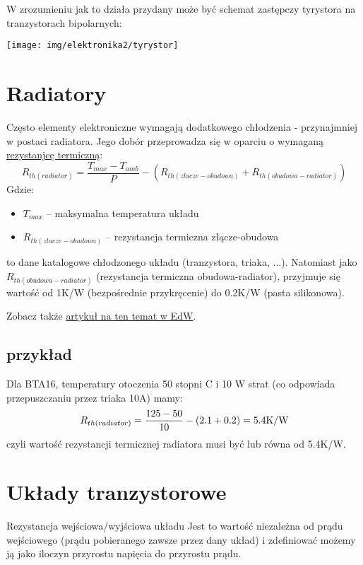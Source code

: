 \documentclass{pdfBooklets}
\begin{document}
W zrozumieniu jak to działa przydany może być schemat zastępczy tyrystora na tranzystorach bipolarnych:

\begin{center}\texttt{[image: img/elektronika2/tyrystor]}\end{center}


\section{Radiatory}

Często elementy elektroniczne wymagają dodatkowego chłodzenia - przynajmniej w postaci radiatora.
Jego dobór przeprowadza się w oparciu o wymaganą \href{https://pl.wikipedia.org/wiki/Rezystancja_termiczna}{rezystanjcę termiczną}:
%
$$R_{th (radiator)} = \frac{T_{max} - T_{amb}}{P} - (R_{th (zlacze-obudowa)} + R_{th (obudowa-radiator)})$$
%
Gdzie:
\begin{itemize}
	\item $T_{max}$ – maksymalna temperatura układu
	\item $R_{th (zlacze-obudowa)}$ – rezystancja termiczna złącze-obudowa
\end{itemize}
to dane katalogowe chłodzonego układu (tranzystora, triaka, ...).
Natomiast jako $R_{th (obudowa-radiator)}$ (rezystancja termiczna obudowa-radiator), przyjmuje się wartość od 1K/W (bezpośrednie przykręcenie) do 0.2K/W (pasta silikonowa).

Zobacz także \href{http://www.elportal.pl/pdf/k01/32_13.pdf}{artykuł na ten temat w EdW}.

\subsection{przykład}

Dla BTA16, temperatury otoczenia 50 stopni C i 10 W strat (co odpowiada przepuszczaniu przez triaka 10A) mamy:
%
$$R_{th (radiator)} = \frac{125-50}{10} - (2.1 + 0.2) = 5.4 \rm{K/W}$$
%
czyli wartość rezystancji termicznej radiatora musi być  lub równa od 5.4K/W.

\section{Układy tranzystorowe}

\begin{ProTip}{Rezystancja wejściowa/wyjściowa układu}
Jest to wartość niezależna od prądu wejściowego (prądu pobieranego zawsze przez dany układ) i zdefiniować możemy ją jako iloczyn przyrostu napięcia do przyrostu prądu.
\end{ProTip}
\end{document}
